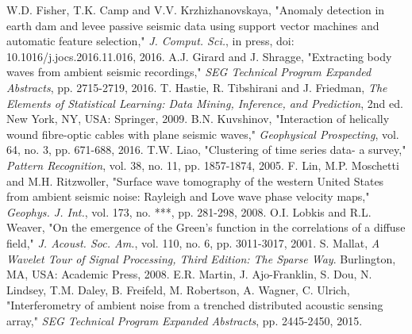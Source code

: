 \documentclass[11pt]{article}
\begin{document}
\begin{thebibliography}{30}
 W.D. Fisher, T.K. Camp and V.V. Krzhizhanovskaya, "Anomaly detection in earth dam and levee passive seismic data using support vector machines and automatic feature selection," \textit{J. Comput. Sci.}, in press, doi: 10.1016/j.jocs.2016.11.016, 2016.
\vspace{-0.2cm}
 A.J. Girard and J. Shragge, "Extracting body waves from ambient seismic recordings," \textit{SEG Technical Program Expanded Abstracts}, pp. 2715-2719, 2016.
\vspace{-0.2cm}
 T. Hastie, R. Tibshirani and J. Friedman, \textit{The Elements of Statistical Learning: Data Mining, Inference, and Prediction}, 2nd ed. New York, NY, USA: Springer, 2009.
\vspace{-0.2cm}
 B.N. Kuvshinov, "Interaction of helically wound fibre-optic cables with plane seismic waves," \textit{Geophysical Prospecting}, vol. 64, no. 3, pp. 671-688, 2016.
\vspace{-0.2cm}
 T.W. Liao, "Clustering of time series data- a survey," \textit{Pattern Recognition}, vol. 38, no. 11, pp. 1857-1874, 2005.
\vspace{-0.2cm}
 F. Lin, M.P. Moschetti and M.H. Ritzwoller, "Surface wave tomography of the western United States from ambient seismic noise: Rayleigh and Love wave phase velocity maps," \textit{Geophys. J. Int.}, vol. 173, no. ***, pp. 281-298, 2008.
\vspace{-0.2cm}
 O.I. Lobkis and R.L. Weaver, "On the emergence of the Green's function in the correlations of a diffuse field," \textit{J. Acoust. Soc. Am.}, vol. 110, no. 6, pp. 3011-3017, 2001.
\vspace{-0.2cm}
 S. Mallat, \textit{A Wavelet Tour of Signal Processing, Third Edition: The Sparse Way}. Burlington, MA, USA: Academic Press, 2008.
\vspace{-0.2cm}
 E.R. Martin, J. Ajo-Franklin, S. Dou, N. Lindsey, T.M. Daley, B. Freifeld, M. Robertson, A. Wagner, C. Ulrich, "Interferometry of ambient noise from a trenched distributed acoustic sensing array," \textit{SEG Technical Program Expanded Abstracts}, pp. 2445-2450, 2015.

\end{thebibliography}
\end{document}
